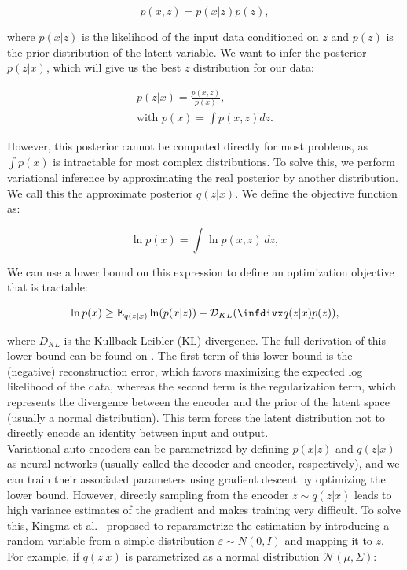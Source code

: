 \begin{equation}
    p(x,z) = p(x|z)p(z),
\end{equation}

where $p(x|z)$ is the likelihood of the input data conditioned on $z$ and $p(z)$ is the prior distribution of the latent variable. We want to infer the posterior $p(z|x)$, which will give us the best $z$ distribution for our data:

\begin{equation} \label{eq:rnnvae:intract}
\begin{gathered}
p(z|x) = \frac{p(x,z)}{p(x)}, \\
\text{with } p(x) = \int p(x,z) dz.
\end{gathered}
\end{equation}

However, this posterior cannot be computed directly for most problems, as $\int p(x)$ is intractable for most complex distributions. To solve this, we perform variational inference by approximating the real posterior by another distribution. We call this the approximate posterior $q(z|x)$. We define the objective function as:

\begin{equation}
\ln p(x) = \int \ln p(x,z) \,dz,
\end{equation}

We can use a lower bound on this expression to define an optimization objective that is tractable: 

\begin{equation}
    \ln p(x) \geq \mathbb{E}_{q(z|x)} \ln(p(x|z)) - \mathcal{D}_{KL}(\infdiv{q(z|x)}{p(z)}),
\end{equation}

where $D_{KL}$ is the Kullback-Leibler (KL) divergence. The full derivation of this lower bound can be found on \cite{Kingma2014}. The first term of this lower bound is the (negative) reconstruction error, which favors maximizing the expected log likelihood of the data, whereas the second term is the regularization term, which represents the divergence between the encoder and the prior of the latent space (usually a normal distribution). This term forces the latent distribution not to directly encode an identity between input and output. \\

Variational auto-encoders can be parametrized by defining $p(x|z)$ and $q(z|x)$ as neural networks (usually called the decoder and encoder, respectively), and we can train their associated parameters using gradient descent by optimizing the lower bound. However, directly sampling from the encoder $z\sim q(z|x)$ leads to high variance estimates of the gradient and makes training very difficult. To solve this, Kingma et al.\ \cite{Kingma2015} proposed to reparametrize the estimation by introducing a random variable from a simple distribution $\varepsilon \sim N(0,I)$ and mapping it to $z$. For example, if $q(z|x)$ is parametrized as a normal distribution $\mathcal{N}(\mu, \Sigma)$:

